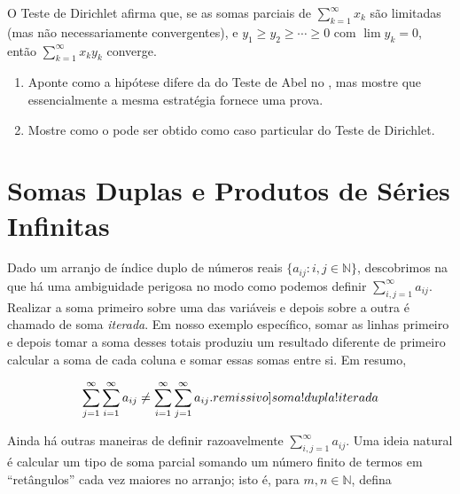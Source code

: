 \begin{exercise}\label{ex:2-7-14}
O Teste de Dirichlet afirma que, se as somas parciais de $\sum_{k=1}^{\infty}x_k$ são limitadas (mas não necessariamente convergentes), e $y_1\geq y_2\geq\cdots\geq0$ com $\lim y_k=0$, então $\sum_{k=1}^{\infty}x_ky_k$ converge.
\begin{enumerate}[label=\alph*)]
\item Aponte como a hipótese difere da do Teste de Abel no , mas mostre que essencialmente a mesma estratégia fornece uma prova.
\item Mostre como o  pode ser obtido como caso particular do Teste de Dirichlet.
\end{enumerate}
\end{exercise}


 
\section{Somas Duplas e Produtos de Séries Infinitas}\label{sec2:somas-duplas-produtos-series}

Dado um arranjo de índice duplo de números reais $\{a_{ij} : i, j \in \mathbb{N}\}$, descobrimos na  que há uma ambiguidade perigosa no modo como podemos definir $\sum_{i,j=1}^{\infty} a_{ij}$. Realizar a soma primeiro sobre uma das variáveis e depois sobre a outra é chamado de soma \textit{iterada}. Em nosso exemplo específico, somar as linhas primeiro e depois tomar a soma desses totais produziu um resultado diferente de primeiro calcular a soma de cada coluna e somar essas somas entre si. Em resumo,

\[
\sum_{j=1}^{\infty} \sum_{i=1}^{\infty} a_{ij} \neq \sum_{i=1}^{\infty} \sum_{j=1}^{\infty} a_{ij}. \index[remissivo]{soma!dupla!iterada}
\]

Ainda há outras maneiras de definir razoavelmente $\sum_{i,j=1}^{\infty} a_{ij}$. Uma ideia natural é calcular um tipo de soma parcial somando um número finito de termos em ``retângulos'' cada vez maiores no arranjo; isto é, para $m, n \in \mathbb{N}$, defina

